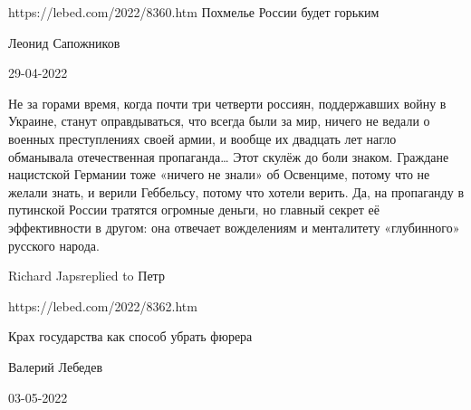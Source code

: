 








https://lebed.com/2022/8360.htm
Похмелье России будет горьким

Леонид Сапожников

29-04-2022

Не за горами время, когда почти три четверти
россиян,
поддержавших войну в Украине, станут оправдываться, что всегда
были за мир,
ничего не ведали о военных преступлениях своей армии, и вообще их
двадцать лет
нагло обманывала отечественная пропаганда… Этот скулёж до боли
знаком. Граждане
нацистской Германии тоже «ничего не знали» об Освенциме, потому
что не желали
знать, и верили Геббельсу, потому что хотели верить. Да, на
пропаганду в
путинской России тратятся огромные деньги, но главный секрет её
эффективности в
другом: она отвечает вожделениям и менталитету «глубинного»
русского
народа. 

Richard Japsreplied to Петр

https://lebed.com/2022/8362.htm

Крах государства как способ убрать фюрера

Валерий Лебедев

03-05-2022 

